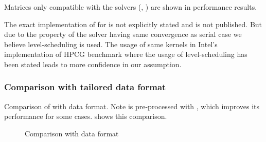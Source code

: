 Matrices only compatible with the solvers (\GS, \KACZ) are shown in performance results.

 The exact implementation of \MKL for \SYMMGS is not explicitly stated and is not published. But due to the property of the solver having same convergence as serial case we believe level-scheduling is used. The usage of same kernels in Intel's implementation of HPCG benchmark where the usage of level-scheduling has been stated \cite{Park_HPCG} leads to more confidence in our assumption.

\subsubsection{Comparison with tailored data format}
Comparison of \RACE with \RSB data format. Note \RSB is pre-processed with \RCM, which improves its performance for some cases.  shows this comparison.

\begin{figure}[thbp]
	\centering
	\hspace{1.2em}
	\caption{Comparison with \RSB data format}
	\label{fig:race_vs_rsb}
\end{figure}


